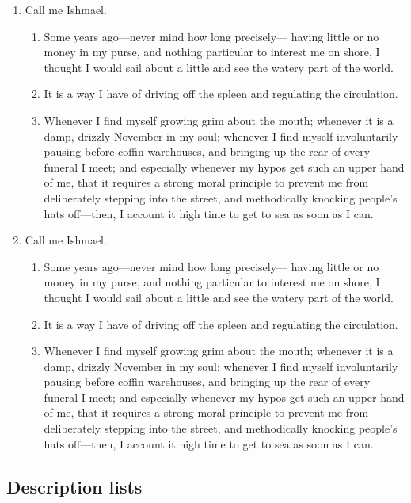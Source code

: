 \documentclass{article}
\begin{document}
\begin{enumerate}
  \item Call me Ishmael.
    \begin{enumerate}
      \item Some years ago---never mind how long precisely---
        having little or no money in my purse, and nothing particular to
        interest me on shore, I thought I would sail about a little and see
        the watery part of the world.
      \item It is a way I have of driving off the
        spleen and regulating the circulation.
      \item Whenever I find myself growing grim about the mouth; whenever it is a damp, drizzly
        November in my soul; whenever I find myself involuntarily pausing
        before coffin warehouses, and bringing up the rear of every funeral
        I meet; and especially whenever my hypos get such an upper hand of me,
        that it requires a strong moral principle to prevent me from
        deliberately stepping into the street, and methodically knocking
        people's hats off---then, I account it high time to get to sea as
        soon as I can.
    \end{enumerate}
  \item Call me Ishmael.
    \begin{enumerate}
      \item Some years ago---never mind how long precisely---
        having little or no money in my purse, and nothing particular to
        interest me on shore, I thought I would sail about a little and see
        the watery part of the world.
      \item It is a way I have of driving off the
        spleen and regulating the circulation.
      \item Whenever I find myself growing grim about the mouth; whenever it is a damp, drizzly
        November in my soul; whenever I find myself involuntarily pausing
        before coffin warehouses, and bringing up the rear of every funeral
        I meet; and especially whenever my hypos get such an upper hand of me,
        that it requires a strong moral principle to prevent me from
        deliberately stepping into the street, and methodically knocking
        people's hats off---then, I account it high time to get to sea as
        soon as I can.
    \end{enumerate}
\end{enumerate}

\subsection{Description lists}
\end{document}
